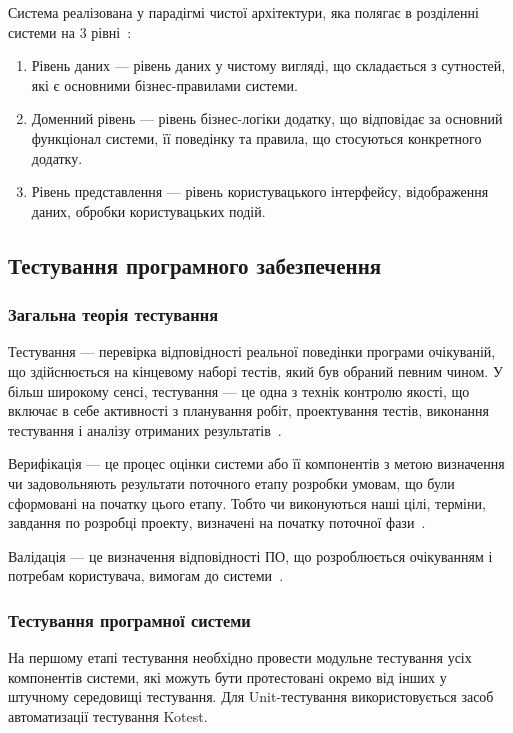 Система реалізована у парадігмі чистої архітектури, яка полягає в розділенні системи на 3 рівні~\cite{Arch2007}:
\begin{enumerate}
	\item Рівень даних --- рівень даних у чистому вигляді, що складається з сутностей, які є основними бізнес-правилами системи.
	\item Доменний рівень --- рівень бізнес-логіки додатку, що відповідає за основний функціонал системи, її поведінку та правила, що стосуються конкретного додатку.
	\item Рівень представлення --- рівень користувацького інтерфейсу, відображення даних, обробки користувацьких подій.
\end{enumerate}

\subsection{Тестування програмного забезпечення}
\subsubsection{Загальна теорія тестування}
Тестування --- перевірка відповідності реальної поведінки програми очікуваній, що здійснюється на кінцевому наборі тестів, який був обраний певним чином.
У більш широкому сенсі, тестування --- це одна з технік контролю якості, що включає в себе активності з планування робіт, проектування тестів, виконання тестування і аналізу отриманих результатів~\cite{Swebok}.

Верифікація --- це процес оцінки системи або її компонентів з метою визначення чи задовольняють результати поточного етапу розробки умовам, що були сформовані на початку цього етапу.
Тобто чи виконуються наші цілі, терміни, завдання по розробці проекту, визначені на початку поточної фази~\cite{Swebok}.

Валідація --- це визначення відповідності ПО, що розроблюється очікуванням і потребам користувача, вимогам до системи~\cite{Swebok}.

\subsubsection{Тестування програмної системи}
На першому етапі тестування необхідно провести модульне тестування усіх компонентів системи, які можуть бути протестовані окремо від інших у штучному середовищі тестування.
Для Unit-тестування використовується засоб автоматизації тестування Kotest.

